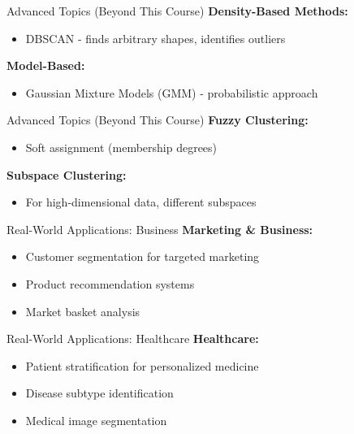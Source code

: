 \documentclass[aspectratio=169,ignorenonframetext]{beamer}
\begin{document}
\begin{frame}{Advanced Topics (Beyond This Course)}
\textbf{Density-Based Methods:}

\begin{itemize}
\item
  DBSCAN - finds arbitrary shapes, identifies outliers
\end{itemize}

\textbf{Model-Based:}

\begin{itemize}
\item
  Gaussian Mixture Models (GMM) - probabilistic approach
\end{itemize}
\end{frame}

\begin{frame}{Advanced Topics (Beyond This Course)}
\textbf{Fuzzy Clustering:}

\begin{itemize}
\item
  Soft assignment (membership degrees)
\end{itemize}

\textbf{Subspace Clustering:}

\begin{itemize}
\item
  For high-dimensional data, different subspaces
\end{itemize}
\end{frame}

\begin{frame}{Real-World Applications: Business}
\textbf{Marketing \& Business:}

\begin{itemize}
\item
  Customer segmentation for targeted marketing
\item
  Product recommendation systems
\item
  Market basket analysis
\end{itemize}
\end{frame}

\begin{frame}{Real-World Applications: Healthcare}
\textbf{Healthcare:}

\begin{itemize}
\item
  Patient stratification for personalized medicine
\item
  Disease subtype identification
\item
  Medical image segmentation
\end{itemize}
\end{frame}
\end{document}
